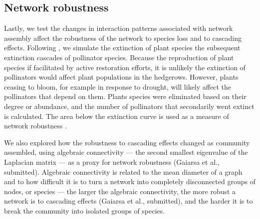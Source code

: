 \documentclass[12pt]{article}
\begin{document}
\subsection*{Network robustness}
Lastly, we test the changes in interaction patterns associated with
network assembly affect the robustness of the network to species loss
and to cascading effects. Following \cite{Memmott2004}, we simulate
the extinction of plant species the subsequent extinction cascades of
pollinator species. Because the reproduction of plant species if
facilitated by active restoration efforts, it is unlikely the
extinction of pollinators would affect plant populations in the
hedgerows. However, plants ceasing to bloom, for example in response
to drought, will likely affect the pollinators that depend on
them. Plants species were eliminated based on their degree or
abundance, and the number of pollinators that secondarily went extinct
is calculated. The area below the extinction curve is used as a
measure of network robustness \citep{bipartite}.

We also explored how the robustness to cascading effects changed as
community assembled, using algebraic connectivity --- the second
smallest eigenvalue of the Laplacian matrix
\citep{fiedler1973algebraic} --- as a proxy for network robustness
(Gaiarsa et al., submitted). Algebraic connectivity is related to the
mean diameter of a graph and to how difficult it is to turn a network
into completely disconnected groups of nodes, or species
\citep{costa2007characterization} --- the larger the algebraic
connectivity, the more robust a network is to cascading effects
(Gaiarsa et al., submitted), and the harder it is to break the
community into isolated groups of species.



\end{document}
